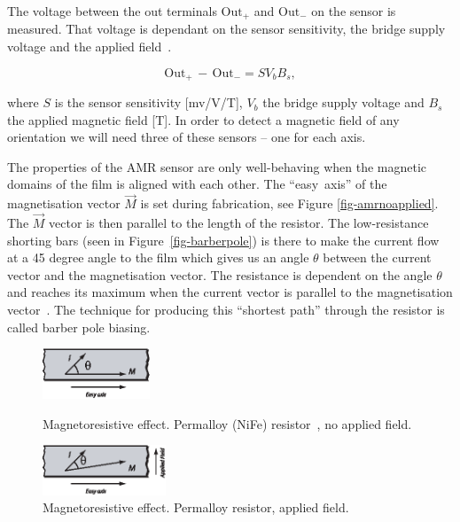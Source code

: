 The voltage between the out terminals $\text{Out}_{+}$ and $\text{Out}_{-}$ on the sensor is measured. That voltage is dependant on the sensor sensitivity, the bridge supply voltage and the applied field~\cite{an218}. 
 
\begin{equation}
 \text{Out}_{+}\,-\,\text{Out}_{-} = SV_bB_s,
\end{equation}

where $S$ is the sensor sensitivity  [mv/V/T], $V_b$ the bridge supply voltage and $B_s$ the applied magnetic field [T].
In order to detect a magnetic field of any orientation we will need three of these sensors -- one for each axis. 

The properties of the AMR sensor are only well-behaving when the magnetic domains of the film is aligned with each other. The ``easy~axis'' of the magnetisation vector $\vec{M}$ is set during fabrication, see Figure \ref{fig-amrnoapplied}. The $\vec{M}$ vector is then parallel to the length of the resistor. The low-resistance shorting bars (seen in Figure~\ref{fig-barberpole}) is there to make the current flow at a 45 degree angle to the film which gives us an angle $\theta$ between the current vector and the magnetisation vector. The resistance is dependent on the angle $\theta$ and reaches its maximum when the current vector is parallel to the magnetisation vector~\cite{caruso1998}. The technique for producing this ``shortest path'' through the resistor is called barber pole biasing.

\begin{subfigures}
\begin{figure}[!ht]
  \centering
  \begin{minipage}{0.3\linewidth}
  \centering
   \includegraphics[height=1.5cm]{images/amrnoapplied}
  \caption[Magnetoresistive effect. Permalloy resistor, no applied field]{Magneto\-resistive effect. Perm\-alloy (NiFe) res\-i\-st\-or~\cite{caruso1998}, no app\-lied field.}
  \label{fig-amrnoapplied}
  \end{minipage}\hspace{0.5cm}
   \begin{minipage}{0.3\linewidth}
  \centering
   \includegraphics[height=1.5cm]{images/amrapplied}
  \caption[Magnetoresistive effect. Permalloy resistor, applied field]{Magnetoresistive effect. Permalloy resistor, applied field.}
  \label{fig-amrapplied}
  \end{minipage}
 \end{figure}
\end{subfigures}

